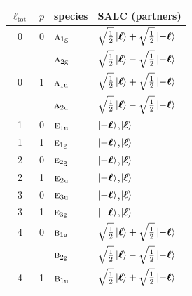 \documentclass[11pt]{article}
\newcommand{\irr}[1]{\text{\normalfont\scshape #1}}
\newcommand{\ptag}[1]{\mathrm{#1}}
\begin{document}
\begin{longtable}{c c l l}\hline $\ell_{\mathrm{tot}}$ & $p$ & species & SALC (partners)\\ \hline\endhead

0 & 0 & $\irr{a}_{1\ptag{g}}$ & $\sqrt{\tfrac{1}{2}}\ket{\boldsymbol\ell}+\sqrt{\tfrac{1}{2}}\ket{-\boldsymbol\ell}$\\

& & $\irr{a}_{2\ptag{g}}$ & $\sqrt{\tfrac{1}{2}}\ket{\boldsymbol\ell}-\sqrt{\tfrac{1}{2}}\ket{-\boldsymbol\ell}$\\

0 & 1 & $\irr{a}_{1\ptag{u}}$ & $\sqrt{\tfrac{1}{2}}\ket{\boldsymbol\ell}+\sqrt{\tfrac{1}{2}}\ket{-\boldsymbol\ell}$\\

& & $\irr{a}_{2\ptag{u}}$ & $\sqrt{\tfrac{1}{2}}\ket{\boldsymbol\ell}-\sqrt{\tfrac{1}{2}}\ket{-\boldsymbol\ell}$\\

1 & 0 & $\irr{e}_{1\ptag{u}}$ & $\ket{-\boldsymbol\ell}$,\quad $\ket{\boldsymbol\ell}$\\

1 & 1 & $\irr{e}_{1\ptag{g}}$ & $\ket{-\boldsymbol\ell}$,\quad $\ket{\boldsymbol\ell}$\\

2 & 0 & $\irr{e}_{2\ptag{g}}$ & $\ket{-\boldsymbol\ell}$,\quad $\ket{\boldsymbol\ell}$\\

2 & 1 & $\irr{e}_{2\ptag{u}}$ & $\ket{-\boldsymbol\ell}$,\quad $\ket{\boldsymbol\ell}$\\

3 & 0 & $\irr{e}_{3\ptag{u}}$ & $\ket{-\boldsymbol\ell}$,\quad $\ket{\boldsymbol\ell}$\\

3 & 1 & $\irr{e}_{3\ptag{g}}$ & $\ket{-\boldsymbol\ell}$,\quad $\ket{\boldsymbol\ell}$\\

4 & 0 & $\irr{b}_{1\ptag{g}}$ & $\sqrt{\tfrac{1}{2}}\ket{\boldsymbol\ell}+\sqrt{\tfrac{1}{2}}\ket{-\boldsymbol\ell}$\\

& & $\irr{b}_{2\ptag{g}}$ & $\sqrt{\tfrac{1}{2}}\ket{\boldsymbol\ell}-\sqrt{\tfrac{1}{2}}\ket{-\boldsymbol\ell}$\\

4 & 1 & $\irr{b}_{1\ptag{u}}$ & $\sqrt{\tfrac{1}{2}}\ket{\boldsymbol\ell}+\sqrt{\tfrac{1}{2}}\ket{-\boldsymbol\ell}$\\


\end{longtable}
\end{document}
